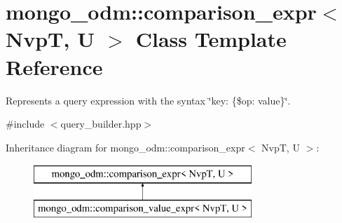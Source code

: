\hypertarget{classmongo__odm_1_1comparison__expr}{}\section{mongo\+\_\+odm\+:\+:comparison\+\_\+expr$<$ NvpT, U $>$ Class Template Reference}
\label{classmongo__odm_1_1comparison__expr}


Represents a query expression with the syntax \char`\"{}key\+: \{\$op\+: value\}\char`\"{}.  




{\ttfamily \#include $<$query\+\_\+builder.\+hpp$>$}

Inheritance diagram for mongo\+\_\+odm\+:\+:comparison\+\_\+expr$<$ NvpT, U $>$\+:\begin{figure}[H]
\begin{center}
\leavevmode
\includegraphics[height=2.000000cm]{classmongo__odm_1_1comparison__expr}
\end{center}
\end{figure}
